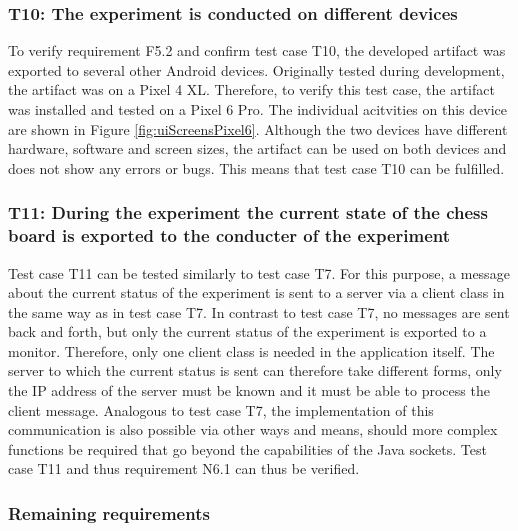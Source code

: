 \subsubsection*{T10: The experiment is conducted on different devices}

To verify requirement F5.2 and confirm test case T10, the developed artifact was exported to several other Android devices. Originally tested during development, the artifact was on a Pixel 4 XL. Therefore, to verify this test case, the artifact was installed and tested on a Pixel 6 Pro. The individual acitvities on this device are shown in Figure \ref{fig:uiScreensPixel6}. Although the two devices have different hardware, software and screen sizes, the artifact can be used on both devices and does not show any errors or bugs. This means that test case T10 can be fulfilled.


\subsubsection*{T11: During the experiment the current state of the chess board is exported to the conducter of the experiment}

Test case T11 can be tested similarly to test case T7. For this purpose, a message about the current status of the experiment is sent to a server via a client class in the same way as in test case T7. In contrast to test case T7, no messages are sent back and forth, but only the current status of the experiment is exported to a monitor. Therefore, only one client class is needed in the application itself. The server to which the current status is sent can therefore take different forms, only the IP address of the server must be known and it must be able to process the client message. Analogous to test case T7, the implementation of this communication is also possible via other ways and means, should more complex functions be required that go beyond the capabilities of the Java sockets. Test case T11 and thus requirement N6.1 can thus be verified.


\subsubsection*{Remaining requirements}


